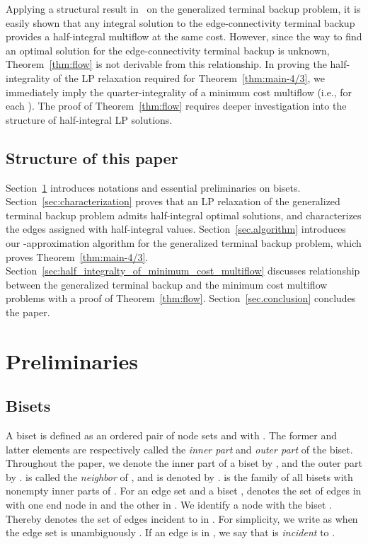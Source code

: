 \documentclass{article}
\begin{document}
Applying a structural result in~\cite{Bernath2014} on the generalized terminal backup problem, 
it is easily shown that any integral solution to the edge-connectivity terminal backup
provides a half-integral multiflow at the same cost. 
However, since the way to find an optimal solution for the edge-connectivity terminal backup is
unknown, Theorem~\ref{thm:flow} is not derivable from this relationship.
In proving the half-integrality of the LP
relaxation required for Theorem~\ref{thm:main-4/3},
we immediately imply the quarter-integrality of a minimum cost multiflow (i.e.,
 for each 
). The proof of Theorem~\ref{thm:flow}
requires deeper investigation into the structure of half-integral LP solutions.

\subsection{Structure of this paper}

Section~\ref{sec:preliminaries} introduces notations and essential preliminaries on bisets.
Section~\ref{sec:characterization} proves that an LP relaxation of the generalized terminal backup
problem admits half-integral optimal solutions, and characterizes the edges assigned with half-integral
values.
Section~\ref{sec.algorithm} introduces our -approximation algorithm for the generalized terminal
backup problem, which proves Theorem~\ref{thm:main-4/3}.
Section~\ref{sec:half_integralty_of_minimum_cost_multiflow}
discusses relationship between the generalized terminal backup 
and the minimum cost multiflow problems with a proof of Theorem~\ref{thm:flow}.
Section~\ref{sec.conclusion} concludes the paper.




\section{Preliminaries} 
\label{sec:preliminaries}

\subsection{Bisets}
A biset  is defined as an ordered pair  of node sets  and  with 
. 
The former and latter elements are respectively called the \emph{inner part} and \emph{outer
part} of the biset. 
Throughout the paper, we denote the inner part of a biset  by , and the outer
part by . 
 is called the \emph{neighbor} of
, and is denoted by . 
 is the family of all bisets with nonempty inner parts of . 
For an edge set  and a biset , 
denotes the set of edges in  with one end node in  and the other in . 
We identify a node  with the biset . Thereby  denotes the set
of edges incident to  in .
For simplicity, we
write  as  when the edge set is unambiguously .
If an edge  is in , we say that  is \emph{incident} to .
\end{document}
